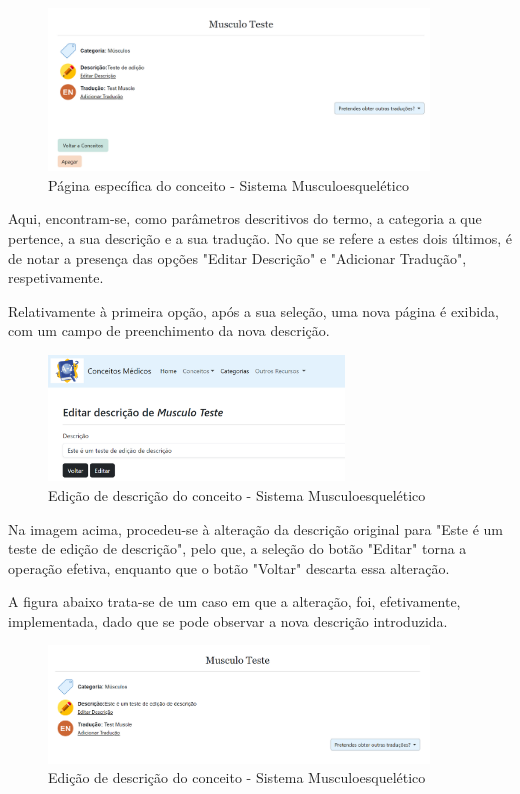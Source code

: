 \begin{figure}[H]
    \centering
    \centering
    \includegraphics[width=0.9\textwidth]{Images/termo1.png}
    \caption{Página específica do conceito - Sistema Musculoesquelético}
    \label{fig:dic-traduc1}
\end{figure}

Aqui, encontram-se, como parâmetros descritivos do termo, a categoria a que pertence, a sua descrição e a sua tradução. No que se refere a estes dois últimos, é de notar a presença das opções "Editar Descrição" e "Adicionar Tradução", respetivamente.

Relativamente à primeira opção, após a sua seleção, uma nova página é exibida, com um campo de preenchimento da nova descrição.

\begin{figure}[H]
    \centering
    \centering
    \includegraphics[width=0.7\textwidth]{Images/termo_editar_desc.png}
    \caption{Edição de descrição do conceito - Sistema Musculoesquelético}
    \label{fig:dic-traduc1}
\end{figure}

Na imagem acima, procedeu-se à alteração da descrição original para "Este é um teste de edição de descrição", pelo que, a seleção do botão "Editar" torna a operação efetiva, enquanto que o botão "Voltar" descarta essa alteração.

A figura abaixo trata-se de um caso em que a alteração, foi, efetivamente, implementada, dado que se pode observar a nova descrição introduzida.

\begin{figure}[H]
    \centering
    \centering
    \includegraphics[width=0.9\textwidth]{Images/termo_desc_editada.png}
    \caption{Edição de descrição do conceito - Sistema Musculoesquelético}
    \label{fig:dic-traduc1}
\end{figure}

